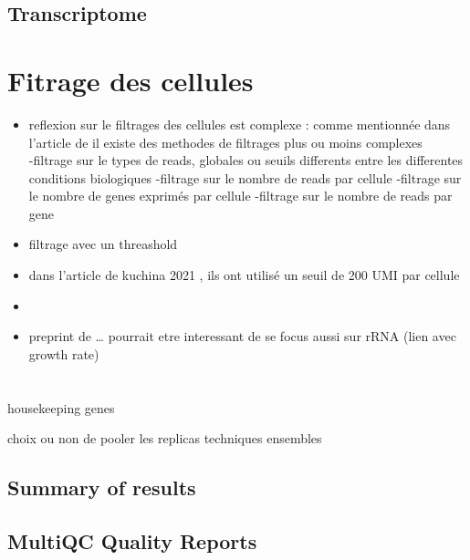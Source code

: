 \documentclass[
  11pt,
  a4paper,
]{report}
\begin{document}
\section{Transcriptome}\label{transcriptome}


\chapter{Fitrage des cellules}\label{fitrage-des-cellules}

\begin{itemize}
\item
  reflexion sur le filtrages des cellules est complexe : comme
  mentionnée dans l'article de il existe des methodes de filtrages plus
  ou moins complexes\\
  -filtrage sur le types de reads, globales ou seuils differents entre
  les differentes conditions biologiques -filtrage sur le nombre de
  reads par cellule -filtrage sur le nombre de genes exprimés par
  cellule -filtrage sur le nombre de reads par gene
\item
  filtrage avec un threashold
\item
  dans l'article de kuchina 2021 , ils ont utilisé un seuil de 200 UMI
  par cellule
\item
\item
  preprint de \ldots{} pourrait etre interessant de se focus aussi sur
  rRNA (lien avec growth rate)
\end{itemize}


\chapter{}\label{section}

housekeeping genes

choix ou non de pooler les replicas techniques ensembles

\section{Summary of results}\label{summary-of-results}

\section{MultiQC Quality Reports}\label{multiqc-quality-reports}
\end{document}
